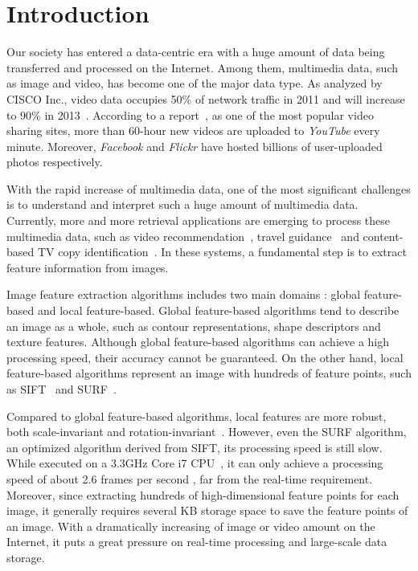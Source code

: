 \section{Introduction}
\label{sec:introduction}

Our society has entered a data-centric era with a huge amount of data being transferred and processed on the Internet. Among them, multimedia data, such as image and video, has become one of the major data type. As analyzed by CISCO Inc., video data occupies 50\% of network traffic in 2011 and will increase to 90\% in 2013~\cite{index2010forecast}.  According to a report~\cite{jansohn2009detecting}, as one of the most popular video sharing sites, more than 60-hour new videos are uploaded to \emph{YouTube} every minute. Moreover, \emph{Facebook} and \emph{Flickr} have hosted billions of user-uploaded photos respectively.

With the rapid increase of multimedia data, one of the most significant challenges is to understand and interpret such a huge amount of multimedia data. Currently, more and more retrieval applications are emerging to process these multimedia data, such as video recommendation~\cite{videorecommendation2007}, travel guidance~\cite{travelguidance2010} and content-based TV copy identification~\cite{tvidentify2003}. In these systems, a fundamental step is to extract feature information from images. 

Image feature extraction algorithms includes two main domains : global feature-based and local feature-based. Global feature-based algorithms tend to describe an image as a whole, such as contour representations, shape descriptors and texture features. Although global feature-based algorithms can achieve a high processing speed, their accuracy cannot be guaranteed. On the other hand, local feature-based algorithms represent  an image with hundreds of feature points, such as SIFT~\cite{Lowe2004SIFT,RobHess} and SURF~\cite{Bay2006SURF,Evans20009OpenSURF}. 

Compared to global feature-based algorithms, local features are more robust, both scale-invariant and rotation-invariant~\cite{mikolajczyk2005performance}\cite{Bauer2007Evaluation}. However, even the SURF algorithm, an optimized algorithm derived from SIFT, its processing speed is still slow. While executed on a 3.3GHz Core i7 CPU~\cite{Fang2011ispass}, it can only achieve a processing speed of  about 2.6 frames per second , far from the real-time requirement. Moreover, since extracting hundreds of high-dimensional feature points for each image, it generally requires several KB storage space to save the feature points of an image. With a dramatically increasing of image or video amount on the Internet, it puts a great pressure on real-time processing and large-scale data storage.

